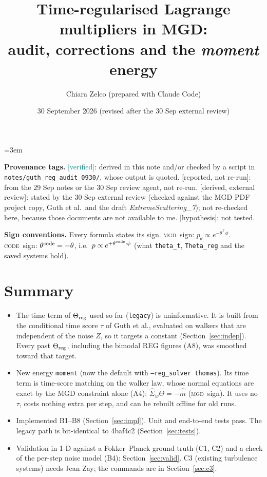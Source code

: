 \documentclass[11pt,a4paper]{article}
\title{Time-regularised Lagrange multipliers in MGD:\\
audit, corrections and the \emph{moment} energy}
\author{Chiara Zelco \quad(prepared with Claude Code)}
\date{30 September 2026 (revised after the 30 Sep external review)}
\newcommand{\code}[1]{\texttt{#1}}
\newcommand{\ver}{\textcolor{teal}{\textsf{[verified]}}}
\newcommand{\rep}{\textcolor{blue!70!black}{\textsf{[reported, not re-run]}}}
\newcommand{\hyp}{\textcolor{orange!80!black}{\textsf{[hypothesis]}}}
\newcommand{\ext}{\textcolor{purple!80!black}{\textsf{[derived, external review]}}}
\newcommand{\MGD}{\textsc{mgd}}
\newcommand{\cs}{\textsc{code}}
\begin{document}
\sloppy\emergencystretch=3em
\maketitle

\noindent\textbf{Provenance tags.}
\ver: derived in this note and/or checked by a script in \code{notes/guth\_reg\_audit\_0930/}, whose output is quoted.
\rep: from the 29 Sep notes or the 30 Sep review agent, not re-run.
\ext: stated by the 30 Sep external review (checked against the MGD PDF project copy, Guth et al.\ and the
draft \emph{ExtremeScattering\_7}); not re-checked here, because those documents are not available to me.
\hyp: not tested.

\noindent\textbf{Sign conventions.} Every formula states its sign. \MGD\ sign: $p_\theta\propto e^{-\theta^\top\phi}$.
\cs\ sign: $\theta^{\rm code}=-\theta$, i.e.\ $p\propto e^{+\theta^{\rm code}\cdot\phi}$ (what \code{theta\_t},
\code{Theta\_reg} and the saved systems hold).

\tableofcontents

\section{Summary}
\begin{itemize}
  \item The time term of $\Theta_{\rm reg}$ used so far (\code{legacy}) is uninformative. It is built from the conditional time
        score $\tau$ of Guth et al., evaluated on walkers that are independent of the noise $Z$, so it targets a constant
        (Section~\ref{sec:indep}). Every past $\Theta_{\rm reg}$, including the bimodal REG figures (A8), was smoothed toward that target.
  \item New energy \code{moment} (now the default with \code{--reg\_solver thomas}). Its time term is time-score matching on the
        walker law, whose normal equations are exact by the MGD constraint alone (A4):
        $\hat\Sigma_w\dot\Theta=-\hat{\dot m}$ (\MGD\ sign). It uses no $\tau$, costs nothing extra per step, and can be
        rebuilt offline for old runs.
  \item Implemented B1--B8 (Section~\ref{sec:impl}). Unit and end-to-end tests pass. The legacy path is bit-identical to 4baf4c2
        (Section~\ref{sec:tests}).
  \item Validation in 1-D against a Fokker--Planck ground truth (C1, C2) and a check of the per-step noise model (B4):
        Section~\ref{sec:valid}. C3 (existing turbulence systems) needs Jean Zay; the commands are in Section~\ref{sec:c3}.
\end{itemize}
\end{document}
